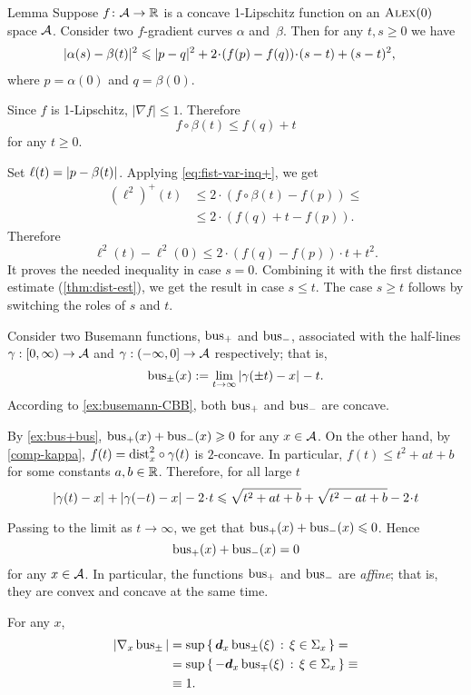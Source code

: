 \begin{thm}{Lemma}\label{lem:dist-estimate}
Suppose $f\colon\mathcal{A}\to\mathbb{R}$ is a concave 1-Lipschitz function on an $\textsc{Alex}(0)$ space $\mathcal{A}$.
Consider two $f$-gradient curves $\alpha$ and~$\beta$.
Then for any $t, s\ge 0$ we have
\begin{align*}
&\dist[2]{\alpha(s)}{\beta(t)}{}
\le 
\dist[2]{p}{q}{}+
2\cdot(f(p)-f(q))\cdot(s-t)+ (s-t)^2,
\end{align*}
where $p=\alpha(0)$ and $q=\beta(0)$.
\end{thm}

Since $f$ is 1-Lipschitz, $|\nabla f|\le1$.
Therefore 
\[f\circ\beta(t)\le f(q)+t\]
for any $t\ge0$.

Set $\ell(t)=|{p}-{\beta(t)}|_{}^{{}}$.
Applying \ref{eq:fist-var-inq+}, we get
\begin{align*}
(\ell^2)^+(t)
&\le 2\cdot \left(f\circ\beta(t)-f(p)\right)\le 
\\
&\le2\cdot\left(f(q)+t-f(p)\right).
\end{align*}
Therefore 
\[\ell^2(t)-\ell^2(0)\le 2\cdot\left(f(q)-f(p)\right)\cdot t + t^2.\]
It proves the needed inequality in case $s=0$.
Combining it with the first distance estimate (\ref{thm:dist-est}), we get the result in case $s\le t$.
The case $s\ge t$ follows by switching the roles of $s$ and $t$.
\qeds


 Consider two Busemann functions, $\operatorname{\rm bus}\nolimits_+$ and $\operatorname{\rm bus}\nolimits_-$, associated with the  half-lines $\gamma:[0,\infty)\to \mathcal{A}$ and $\gamma:(-\infty,0]\to \mathcal{A}$ respectively; that is,
\[
\operatorname{\rm bus}\nolimits_\pm(x)
\mathrel{:=}
\lim_{t\to\infty}|{\gamma(\pm t)}-{x}|_{}^{{}}- t.
\]
According to \ref{ex:busemann-CBB}, 
both $\operatorname{\rm bus}\nolimits_+$ and $\operatorname{\rm bus}\nolimits_-$ are concave.

By \ref{ex:bus+bus}, $\operatorname{\rm bus}\nolimits_+(x)+\operatorname{\rm bus}\nolimits_-(x)\geqslant0$ for any $x\in \mathcal{A}$.
On the other hand, by \ref{comp-kappa}, 
$f(t)=\mathrm{dist}_x^2\circ\gamma(t)$ 
is $2$-concave.
In particular, $f(t)\le t^2+at+b$ for some constants $a,b\in\mathbb{R}$.  Therefore, for all large $t$
\[
\dist{\gamma( t)}{x}{}+\dist{\gamma(- t)}{x}{}- 2\cdot t
\le \sqrt{ t^2+at+b}+\sqrt{ t^2-at+b}-2\cdot t
\]

Passing to the limit as $t\to\infty$, we get that  $\operatorname{\rm bus}\nolimits_+(x)+\operatorname{\rm bus}\nolimits_-(x)\leqslant 0$.
Hence
\[
\operatorname{\rm bus}\nolimits_+(x)+\operatorname{\rm bus}\nolimits_-(x)= 0
\]
for any $x\in \mathcal{A}$.
In particular, the functions $\operatorname{\rm bus}\nolimits_+$ and $\operatorname{\rm bus}\nolimits_-$ are \emph{affine};
that is, they are convex and concave at the same time.

For any $x$,
\begin{align*}
|\nabla_x \operatorname{\rm bus}\nolimits_\pm|
&=\sup\left\{\,{\bm{d}_x\operatorname{\rm bus}\nolimits_\pm(\xi)}\,:\,{\xi\in\Sigma_x}\,\right\}=
\\
&=\sup\left\{\,{-\bm{d}_x\operatorname{\rm bus}\nolimits_\mp(\xi)}\,:\,{\xi\in\Sigma_x}\,\right\}\equiv
\\
&\equiv1.
\end{align*}

